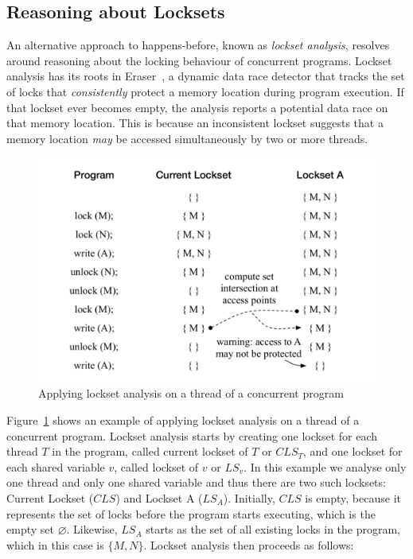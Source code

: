 \subsection{Reasoning about Locksets}
\label{bg:lockset}

An alternative approach to happens-before, known as \emph{lockset analysis}, resolves around reasoning about the locking behaviour of concurrent programs. Lockset analysis has its roots in Eraser~\cite{savage1997eraser}, a dynamic data race detector that tracks the set of locks that \emph{consistently} protect a memory location during program execution. If that lockset ever becomes empty, the analysis reports a potential data race on that memory location. This is because an inconsistent lockset suggests that a memory location \emph{may} be accessed simultaneously by two or more threads.

\begin{figure}[htbp]
\centering
\includegraphics[width=1\linewidth]{img/lockset.pdf}
\caption{Applying lockset analysis on a thread of a concurrent program}
\label{fig:locksets}
\end{figure}

Figure~\ref{fig:locksets} shows an example of applying lockset analysis on a thread of a concurrent program. Lockset analysis starts by creating one lockset for each thread $T$ in the program, called current lockset of $T$ or $CLS_T$, and one lockset for each shared variable $v$, called lockset of $v$ or $LS_v$. In this example we analyse only one thread and only one shared variable and thus there are two such locksets: Current Lockset ($CLS$) and Lockset A ($LS_A$). Initially, $CLS$ is empty, because it represents the set of locks before the program starts executing, which is the empty set $\varnothing$. Likewise, $LS_A$ starts as the set of all existing locks in the program, which in this case is $\{M, N\}$. Lockset analysis then proceeds as follows:

